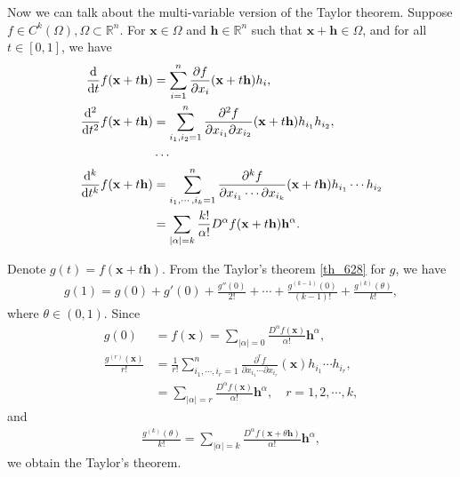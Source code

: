 \documentclass[11pt]{book}
\theoremstyle{definition}
\numberwithin{equation}{chapter}
\begin{document}
\medskip

Now we can talk about the multi-variable version of the Taylor theorem. Suppose $f \in C^k(\Omega), \Omega \subset \mathbb{R}^n$. For $\mathbf{x} \in \Omega$ and $\mathbf{h} \in \mathbb{R}^n$ such that $\mathbf{x} + \mathbf{h} \in \Omega$, and for all $t \in [0,1]$, we have
\begin{align*}
    \dv{}{t}f(\mathbf{x} + t\mathbf{h}) & = \sum^n_{i=1} \frac{\partial f}{\partial x_i}(\mathbf{x} + t\mathbf{h}) h_i, \\
    \dv{^2}{t^2}f(\mathbf{x} + t\mathbf{h}) & = \sum^n_{i_1,i_2=1} \frac{\partial^2 f}{\partial x_{i_1} \partial x_{i_2}}(\mathbf{x} + t\mathbf{h}) h_{i_1} h_{i_2}, \\
    & \cdots \\
    \dv{^k}{t^k}f(\mathbf{x} + t\mathbf{h}) & = \sum^n_{i_1,\cdots,i_k=1} \frac{\partial^k f}{\partial x_{i_1} \cdots \partial x_{i_k}} (\mathbf{x} + t\mathbf{h}) h_{i_1} \cdots h_{i_2} \\
    & = \sum_{\left|\alpha\right|=k} \frac{k!}{\alpha!} D^{\alpha} f(\mathbf{x} + t\mathbf{h}) \mathbf{h}^{\alpha}.
\end{align*}

Denote $g(t) = f(\mathbf{x} + t\mathbf{h})$. From the Taylor's theorem \ref{th_628} for $g$, we have
\begin{align*}
    g(1) = g(0) + g'(0) + \frac{g''(0)}{2!} + \cdots + \frac{g^{(k-1)}(0)}{(k-1)!} + \frac{g^{(k)}(\theta)}{k!},
\end{align*}
where $\theta \in (0,1)$. Since
\begin{align*}
    g(0) & = f(\mathbf{x}) = \sum_{\left|\alpha\right|=0}  \frac{D^{\alpha} f(\mathbf{x})}{\alpha!} \mathbf{h}^{\alpha}, \\
    \frac{g^{(r)}(\mathbf{x})}{r!} & = \frac{1}{r!} \sum^n_{i_1,\cdots,i_r=1} \frac{\partial^r f}{\partial x_{i_1} \cdots \partial x_{i_r}}(\mathbf{x}) h_{i_1} \cdots h_{i_r}, \\
    & = \sum_{\left|\alpha\right| = r} \frac{D^{\alpha} f(\mathbf{x})}{\alpha!} \mathbf{h}^{\alpha}, \quad r = 1,2,\cdots,k,
\end{align*}
and
\begin{align*}
    \frac{g^{(k)}(\theta)}{k!} = \sum_{\left|\alpha\right| = k} \frac{D^{\alpha} f(\mathbf{x} + \theta \mathbf{h})}{\alpha!} \mathbf{h}^{\alpha},
\end{align*}
we obtain the Taylor's theorem.

\medskip
\end{document}
